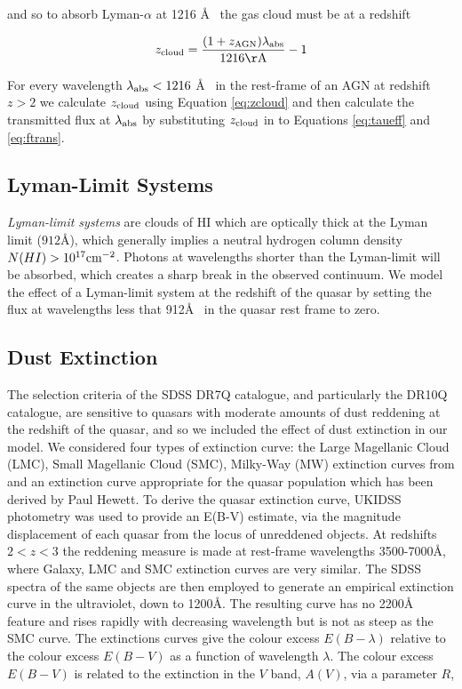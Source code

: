 and so to absorb Lyman-$\alpha$ at 1216 \AA~ the gas cloud must be at a redshift

\begin{eqnarray}
  \label{eq:zcloud}
  z_{\rm cloud} = \frac{ (1 + z_{\rm AGN}) \lambda_{\rm abs} } { 1216{\rm \AA} } - 1
\end{eqnarray}

For every wavelength $\lambda_{\rm abs} < 1216$ \AA~ in the rest-frame of an AGN at redshift $z > 2$ we calculate $z_{\rm cloud}$ using Equation \ref{eq:zcloud} and then calculate the transmitted flux at $\lambda_{\rm abs}$ by substituting $z_{\rm cloud}$ in to Equations \ref{eq:taueff} and \ref{eq:ftrans}. 

\subsection{Lyman-Limit Systems}

{\it Lyman-limit systems} are clouds of HI which are optically thick at the Lyman limit ($912$\AA), which generally implies a neutral hydrogen column density $N(HI) > 10^{17} {\rm cm}^{-2}$. Photons at wavelengths shorter than the Lyman-limit will be absorbed, which creates a sharp break in the observed continuum. We model the effect of a Lyman-limit system at the redshift of the quasar by setting the flux at wavelengths less that 912\AA~ in the quasar rest frame to zero.   

\subsection{Dust Extinction} 

The selection criteria of the SDSS DR7Q catalogue, and particularly the DR10Q catalogue, are sensitive to quasars with moderate amounts of dust reddening \citep[possibly as high as E(B-V) $\sim$ 0.5;][]{richards03} at the redshift of the quasar, and so we included the effect of dust extinction in our model. We considered four types of extinction curve: the Large Magellanic Cloud (LMC), Small Magellanic Cloud (SMC), Milky-Way (MW) extinction curves from \citet{pei92} and an extinction curve appropriate for the quasar population which has been derived by Paul Hewett. To derive the quasar extinction curve, UKIDSS photometry was used to provide an E(B-V) estimate, via the magnitude displacement of each quasar from the locus of unreddened objects. At redshifts $2 < z < 3$ the reddening measure is made at rest-frame wavelengths 3500-7000\AA, where Galaxy, LMC and SMC extinction curves are very similar. The SDSS spectra of the same objects are then employed to generate an empirical extinction curve in the ultraviolet, down to 1200\AA. The resulting curve has no 2200\AA~ feature and rises rapidly with decreasing wavelength but is not as steep as the SMC curve. The extinctions curves give the colour excess $E(B-\lambda)$ relative to the colour excess $E(B-V)$ as a function of wavelength $\lambda$. The colour excess $E(B-V)$ is related to the extinction in the $V$ band, $A(V)$, via a parameter $R$, 

